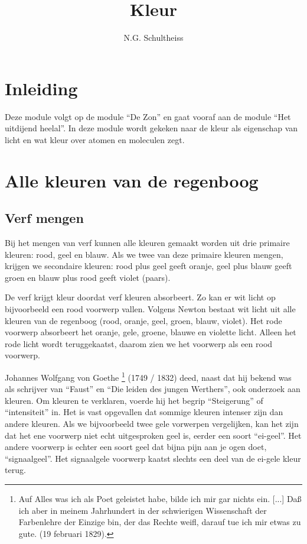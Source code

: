 



\title{Kleur}
\author{N.G. Schultheiss}
\date{}

\maketitle
\thispagestyle{firststyle}

\section{Inleiding}

Deze module volgt op de module ``De Zon'' en gaat vooraf aan de
module ``Het uitdijend heelal''. In deze module wordt gekeken naar
de kleur als eigenschap van licht en wat kleur over atomen en moleculen
zegt.


\section{Alle kleuren van de regenboog}


\subsection{Verf mengen}

Bij het mengen van verf kunnen alle kleuren gemaakt worden uit drie
primaire kleuren: rood, geel en blauw. Als we twee van deze primaire
kleuren mengen, krijgen we secondaire kleuren: rood plus geel geeft
oranje, geel plus blauw geeft groen en blauw plus rood geeft violet
(paars). 

De verf krijgt kleur doordat verf kleuren absorbeert. Zo kan er wit
licht op bijvoorbeeld een rood voorwerp vallen. Volgens Newton bestaat
wit licht uit alle kleuren van de regenboog (rood, oranje, geel, groen,
blauw, violet). Het rode voorwerp absorbeert het oranje, gele, groene,
blauwe en violette licht. Alleen het rode licht wordt teruggekaatst,
daarom zien we het voorwerp als een rood voorwerp.

Johannes Wolfgang von Goethe \footnote{Auf Alles was ich als Poet
geleistet habe, bilde ich mir gar nichts ein. {[}...{]} Daß ich aber in
meinem Jahrhundert in der schwierigen Wissenschaft der Farbenlehre der
Einzige bin, der das Rechte weiﬂ, darauf tue ich mir etwas zu gute. (19
februari 1829).} (1749 / 1832) deed, naast dat hij bekend was als
schrijver van ``Faust'' en ``Die leiden des jungen Werthers'', ook
onderzoek aan kleuren. Om kleuren te verklaren, voerde hij het begrip
``Steigerung'' of ``intensiteit'' in. Het is vast opgevallen dat sommige
kleuren intenser zijn dan andere kleuren. Als we bijvoorbeeld twee gele
vorwerpen vergelijken, kan het zijn dat het ene voorwerp niet echt
uitgesproken geel is, eerder een soort ``ei-geel''. Het andere voorwerp
is echter een soort geel dat bijna pijn aan je ogen doet,
``signaalgeel''. Het signaalgele voorwerp kaatst slechts een deel van de
ei-gele kleur terug.

